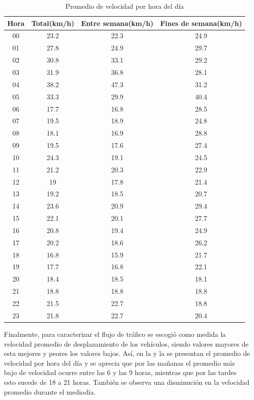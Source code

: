 \begin{table}[h]
	\centering
	\begin{tabular}{cccc}
        \toprule
    	Hora  & Total(km/h) & Entre semana(km/h) & Fines de semana(km/h)\\
    	\midrule
    	00 & 23.2 & 22.3 & 24.9 \\
    	01 & 27.8 & 24.9 & 29.7 \\
    	02 & 30.8 & 33.1 & 29.2 \\ 
    	03 & 31.9 & 36.8 & 28.1\\
    	04 & 38.2 & 47.3 & 31.2\\
    	05 & 33.3 & 29.9 & 40.4\\
    	06 & 17.7 & 16.8 & 28.5\\
    	07 & 19.5 & 18.9 & 24.8\\
    	08 & 18.1 & 16.9 & 28.8\\
    	09 & 19.5 & 17.6 & 27.4\\ 
    	10 & 24.3 & 19.1 & 24.5\\
    	11 & 21.2 & 20.3 & 22.9\\
    	12 & 19 & 17.8 & 21.4\\
    	13 & 19.2 & 18.5 & 20.7\\
    	14 & 23.6 & 20.9 & 29.4\\
    	15 & 22.1 & 20.1 & 27.7\\
    	16 & 20.8 & 19.4 & 24.9\\ 
    	17 & 20.2 & 18.6 & 26,2\\
    	18 & 16.8 & 15.9 & 21.7\\
    	19 & 17.7 & 16.8 & 22.1\\
    	20 & 18.4 & 18.5 & 18.1\\
    	21 & 18.8 & 18.8 & 18.8\\
    	22 & 21.5 & 22.7 & 18.8\\
    	23 & 21.8 & 22.7 & 20.4\\
    	\bottomrule
	\end{tabular}
	\caption{Promedio de velocidad por hora del día} 
	\label{table:velocidad_por_hora}
\end{table}

Finalmente, para caracterizar el flujo de tráfico se escogió como medida la velocidad promedio de desplazamiento de los vehículos, siendo valores mayores de esta mejores y peores los valores bajos. Así, en la  y la  se presentan el promedio de velocidad por hora del día y se aprecia que por las mañanas el promedio más bajo de velocidad ocurre entre las 6 y las 9 horas, mientras que por las tardes esto sucede de 18 a 21 horas. También se observa una disminución en la velocidad promedio durante el mediodía. 

